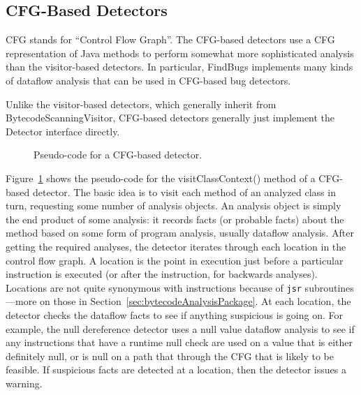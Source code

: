 \documentclass[11pt]{article}
\newcommand{\Indent}{\hskip .25in}
\newcommand{\ForEach}{{\bf for each}}
\newcommand{\Do}{{\bf do}}
\newcommand{\If}{{\bf if}}
\newcommand{\Then}{{\bf then}}
\newcommand{\EndFor}{{\bf end for}}
\newcommand{\EndIf}{{\bf end if}}
\begin{document}
\subsection{CFG-Based Detectors}

CFG stands for ``Control Flow Graph''.  The CFG-based detectors use a
CFG representation of Java methods to perform somewhat more sophisticated
analysis than the visitor-based detectors.  In particular, FindBugs
implements many kinds of dataflow analysis that can be used in CFG-based
bug detectors.

Unlike the visitor-based detectors, which generally inherit from
BytecodeScanningVisitor,
CFG-based detectors generally just implement the Detector interface
directly.

\begin{figure}
\caption{Pseudo-code for a CFG-based detector.}\label{fig:cfgBasedDetector}
\end{figure}

Figure~\ref{fig:cfgBasedDetector} shows the pseudo-code for the
visitClassContext() method of a CFG-based detector.
The basic idea is to visit each method of an analyzed class in turn,
requesting some number of analysis objects.  An analysis object
is simply the end product of some analysis: it records facts 
(or probable facts) about the method based on some form of program
analysis, usually dataflow analysis.
After getting the required analyses, the detector iterates through
each location in the control flow graph.  A location is
the point in execution just before a particular instruction is executed
(or after the instruction, for backwards analyses).  Locations are not quite synonymous
with instructions because of {\tt jsr} subroutines---more on those
in Section~\ref{sec:bytecodeAnalysisPackage}.  At each location,
the detector checks the dataflow facts to see if anything suspicious is
going on.  For example, the null dereference detector uses a null value
dataflow analysis to see if any instructions that have a runtime null
check are used on a value that is either definitely null, or is null
on a path that through the CFG that is likely to be feasible.
If suspicious facts are detected at a location, then the detector issues a warning.
\end{document}

